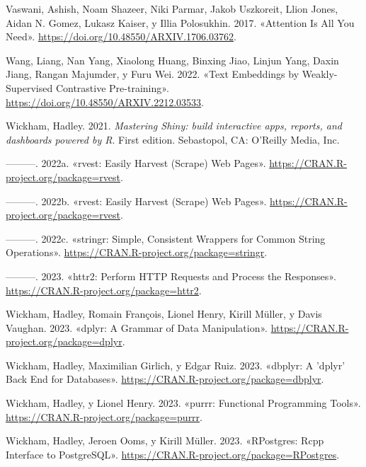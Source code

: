 \documentclass[
  12pt,
  openany]{book}
\newlength{\cslhangindent}
\newlength{\cslentryspacingunit} %
\newenvironment{CSLReferences}[2] %
 {%
  \setlength{\parindent}{0pt}
  \ifodd #1
  \let\oldpar\par
  \def\par{\hangindent=\cslhangindent\oldpar}
  \fi
  \setlength{\parskip}{#2\cslentryspacingunit}
 }%
 {}
\begin{document}
\begin{CSLReferences}{1}{0}
\leavevmode{}%
Vaswani, Ashish, Noam Shazeer, Niki Parmar, Jakob Uszkoreit, Llion Jones, Aidan N. Gomez, Lukasz Kaiser, y Illia Polosukhin. 2017. {«Attention Is All You Need»}. \url{https://doi.org/10.48550/ARXIV.1706.03762}.

\leavevmode{}%
Wang, Liang, Nan Yang, Xiaolong Huang, Binxing Jiao, Linjun Yang, Daxin Jiang, Rangan Majumder, y Furu Wei. 2022. {«Text Embeddings by Weakly-Supervised Contrastive Pre-training»}. \url{https://doi.org/10.48550/ARXIV.2212.03533}.

\leavevmode{}%
Wickham, Hadley. 2021. \emph{Mastering Shiny: build interactive apps, reports, and dashboards powered by R}. First edition. Sebastopol, CA: O'Reilly Media, Inc.

\leavevmode{}%
---------. 2022a. {«rvest: Easily Harvest (Scrape) Web Pages»}. \url{https://CRAN.R-project.org/package=rvest}.

\leavevmode{}%
---------. 2022b. {«rvest: Easily Harvest (Scrape) Web Pages»}. \url{https://CRAN.R-project.org/package=rvest}.

\leavevmode{}%
---------. 2022c. {«stringr: Simple, Consistent Wrappers for Common String Operations»}. \url{https://CRAN.R-project.org/package=stringr}.

\leavevmode{}%
---------. 2023. {«httr2: Perform HTTP Requests and Process the Responses»}. \url{https://CRAN.R-project.org/package=httr2}.

\leavevmode{}%
Wickham, Hadley, Romain François, Lionel Henry, Kirill Müller, y Davis Vaughan. 2023. {«dplyr: A Grammar of Data Manipulation»}. \url{https://CRAN.R-project.org/package=dplyr}.

\leavevmode{}%
Wickham, Hadley, Maximilian Girlich, y Edgar Ruiz. 2023. {«dbplyr: A 'dplyr' Back End for Databases»}. \url{https://CRAN.R-project.org/package=dbplyr}.

\leavevmode{}%
Wickham, Hadley, y Lionel Henry. 2023. {«purrr: Functional Programming Tools»}. \url{https://CRAN.R-project.org/package=purrr}.

\leavevmode{}%
Wickham, Hadley, Jeroen Ooms, y Kirill Müller. 2023. {«RPostgres: Rcpp Interface to PostgreSQL»}. \url{https://CRAN.R-project.org/package=RPostgres}.


\end{CSLReferences}
\end{document}
